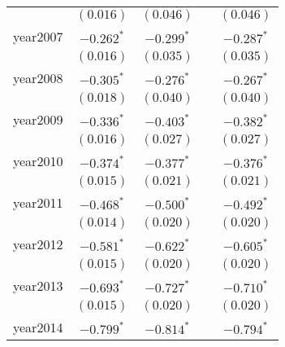 \begin{center}
\begin{longtable}{l c c c c}
                         & $(0.016)$             & $(0.046)$             &                       & $(0.046)$             \\
year2007                 & $\mathbf{-0.262}^{*}$ & $\mathbf{-0.299}^{*}$ &                       & $\mathbf{-0.287}^{*}$ \\
                         & $(0.016)$             & $(0.035)$             &                       & $(0.035)$             \\
year2008                 & $\mathbf{-0.305}^{*}$ & $\mathbf{-0.276}^{*}$ &                       & $\mathbf{-0.267}^{*}$ \\
                         & $(0.018)$             & $(0.040)$             &                       & $(0.040)$             \\
year2009                 & $\mathbf{-0.336}^{*}$ & $\mathbf{-0.403}^{*}$ &                       & $\mathbf{-0.382}^{*}$ \\
                         & $(0.016)$             & $(0.027)$             &                       & $(0.027)$             \\
year2010                 & $\mathbf{-0.374}^{*}$ & $\mathbf{-0.377}^{*}$ &                       & $\mathbf{-0.376}^{*}$ \\
                         & $(0.015)$             & $(0.021)$             &                       & $(0.021)$             \\
year2011                 & $\mathbf{-0.468}^{*}$ & $\mathbf{-0.500}^{*}$ &                       & $\mathbf{-0.492}^{*}$ \\
                         & $(0.014)$             & $(0.020)$             &                       & $(0.020)$             \\
year2012                 & $\mathbf{-0.581}^{*}$ & $\mathbf{-0.622}^{*}$ &                       & $\mathbf{-0.605}^{*}$ \\
                         & $(0.015)$             & $(0.020)$             &                       & $(0.020)$             \\
year2013                 & $\mathbf{-0.693}^{*}$ & $\mathbf{-0.727}^{*}$ &                       & $\mathbf{-0.710}^{*}$ \\
                         & $(0.015)$             & $(0.020)$             &                       & $(0.020)$             \\
year2014                 & $\mathbf{-0.799}^{*}$ & $\mathbf{-0.814}^{*}$ &                       & $\mathbf{-0.794}^{*}$ \\

\end{longtable}
\end{center}
